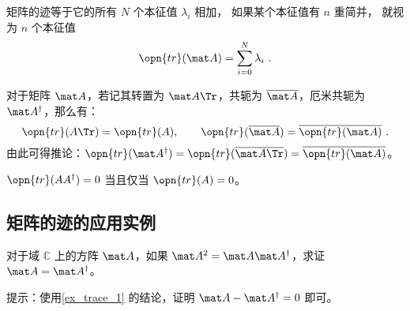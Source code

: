 \begin{theorem}{}
矩阵的迹等于它的所有 $N$ 个本征值 $\lambda_i$ 相加， 如果某个本征值有 $n$ 重简并， 就视为 $n$ 个本征值
\begin{equation}
\opn{tr}(\mat A) = \sum_{i=0}^N \lambda_i~.
\end{equation}
\end{theorem}


\begin{exercise}{}\label{exe_trace_1}
对于矩阵 $\mat A$，若记其转置为 $\mat A\Tr$，共轭为 $\overline{\mat A}$，厄米共轭为 $\mat A^\dagger$，那么有：
\begin{equation}
\opn{tr}(A\Tr)=\opn{tr}(A), \qquad \opn{tr}(\overline{\mat A})=\overline{\opn{tr}(\mat A)}~.
\end{equation}
由此可得推论：$\opn{tr}(\mat A^\dagger)=\opn{tr}(\overline{\mat A\Tr})=\overline{\opn{tr}(\mat A)}$。
\end{exercise}

\begin{example}{}\label{ex_trace_1}
$\opn{tr}(AA^\dagger)=0$ 当且仅当 $\opn{tr}(A)=0$。
\end{example}

\subsection{矩阵的迹的应用实例}

\begin{exercise}{}
对于域 $\mathbb{C}$ 上的方阵 $\mat A$，如果 $\mat A^2=\mat A\mat A^\dagger$，求证 $\mat A=\mat A^\dagger$。

提示：使用\autoref{ex_trace_1} 的结论，证明 $\mat A-\mat A^\dagger=0$ 即可。
\end{exercise}

